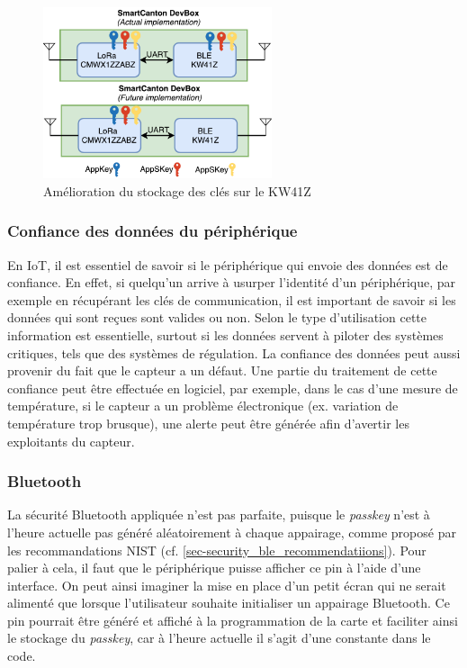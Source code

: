\begin{figure}[ht!]
    \centering
    \includegraphics[width=0.6\textwidth]{Figures/diagram_keys_devbox.pdf}
    \caption{Amélioration du stockage des clés sur le KW41Z}
    \label{fig-diagram_keys_devbox}
\end{figure}


\subsubsection{Confiance des données du périphérique}

En IoT, il est essentiel de savoir si le périphérique qui envoie des données est de confiance. En effet, si quelqu'un arrive à usurper l'identité d'un périphérique, par exemple en récupérant les clés de communication, il est important de savoir si les données qui sont reçues sont valides ou non. Selon le type d'utilisation cette information est essentielle, surtout si les données servent à piloter des systèmes critiques, tels que des systèmes de régulation. La confiance des données peut aussi provenir du fait que le capteur a un défaut. Une partie du traitement de cette confiance peut être effectuée en logiciel, par exemple, dans le cas d'une mesure de température, si le capteur a un problème électronique (ex. variation de température trop brusque), une alerte peut être générée afin d'avertir les exploitants du capteur.

\subsubsection{Bluetooth}

La sécurité Bluetooth appliquée n'est pas parfaite, puisque le \textit{passkey} n'est à l'heure actuelle pas généré aléatoirement à chaque appairage, comme proposé par les recommandations NIST (cf. \cref{sec-security_ble_recommendatiions}). Pour palier à cela, il faut que le périphérique puisse afficher ce pin à l'aide d'une interface. On peut ainsi imaginer la mise en place d'un petit écran qui ne serait alimenté que lorsque l'utilisateur souhaite initialiser un appairage Bluetooth. Ce pin pourrait être généré et affiché à la programmation de la carte et faciliter ainsi le stockage du \textit{passkey}, car à l'heure actuelle il s'agit d'une constante dans le code.


